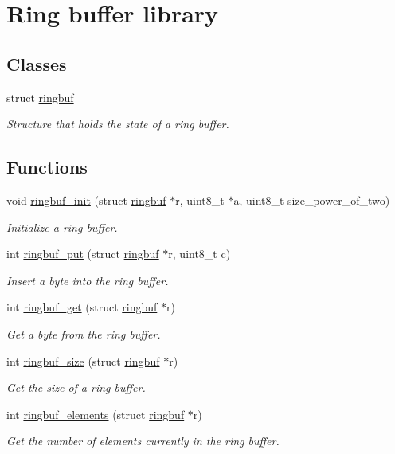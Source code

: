 \hypertarget{group__ringbuf}{}\section{Ring buffer library}
\label{group__ringbuf}
\subsection*{Classes}
\begin{DoxyCompactItemize}
\item 
struct \hyperlink{structringbuf}{ringbuf}
\begin{DoxyCompactList}\small\item\em Structure that holds the state of a ring buffer. \end{DoxyCompactList}\end{DoxyCompactItemize}
\subsection*{Functions}
\begin{DoxyCompactItemize}
\item 
void \hyperlink{group__ringbuf_ga5e40b0459813787a4e67fceb0aab5fd6}{ringbuf\+\_\+init} (struct \hyperlink{structringbuf}{ringbuf} $\ast$r, uint8\+\_\+t $\ast$a, uint8\+\_\+t size\+\_\+power\+\_\+of\+\_\+two)
\begin{DoxyCompactList}\small\item\em Initialize a ring buffer. \end{DoxyCompactList}\item 
int \hyperlink{group__ringbuf_ga2a370b54ed5d194e188a94e505b48eeb}{ringbuf\+\_\+put} (struct \hyperlink{structringbuf}{ringbuf} $\ast$r, uint8\+\_\+t c)
\begin{DoxyCompactList}\small\item\em Insert a byte into the ring buffer. \end{DoxyCompactList}\item 
int \hyperlink{group__ringbuf_ga2972cc12c40c75e5c883e831ff8c14ab}{ringbuf\+\_\+get} (struct \hyperlink{structringbuf}{ringbuf} $\ast$r)
\begin{DoxyCompactList}\small\item\em Get a byte from the ring buffer. \end{DoxyCompactList}\item 
int \hyperlink{group__ringbuf_ga0c16200911b10f8137499825b5803b8d}{ringbuf\+\_\+size} (struct \hyperlink{structringbuf}{ringbuf} $\ast$r)
\begin{DoxyCompactList}\small\item\em Get the size of a ring buffer. \end{DoxyCompactList}\item 
int \hyperlink{group__ringbuf_ga8b3f31407ae7e5a98f9cedcb6f5bd82b}{ringbuf\+\_\+elements} (struct \hyperlink{structringbuf}{ringbuf} $\ast$r)
\begin{DoxyCompactList}\small\item\em Get the number of elements currently in the ring buffer. \end{DoxyCompactList}\end{DoxyCompactItemize}


